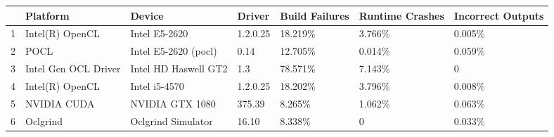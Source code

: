 \begin{tabular}{lllllll}
\toprule
{} &              Platform &                Device &    Driver & Build Failures & Runtime Crashes & Incorrect Outputs \\
\midrule
1 &       Intel(R) OpenCL &         Intel E5-2620 &  1.2.0.25 &        18.219\% &          3.766\% &            0.005\% \\
2 &                  POCL &  Intel E5-2620 (pocl) &      0.14 &        12.705\% &          0.014\% &            0.059\% \\
3 &  Intel Gen OCL Driver &  Intel HD Haswell GT2 &       1.3 &        78.571\% &          7.143\% &                 0 \\
4 &       Intel(R) OpenCL &         Intel i5-4570 &  1.2.0.25 &        18.202\% &          3.796\% &            0.008\% \\
5 &           NVIDIA CUDA &       NVIDIA GTX 1080 &    375.39 &         8.265\% &          1.062\% &            0.063\% \\
6 &              Oclgrind &    Oclgrind Simulator &     16.10 &         8.338\% &               0 &            0.033\% \\
\bottomrule
\end{tabular}
